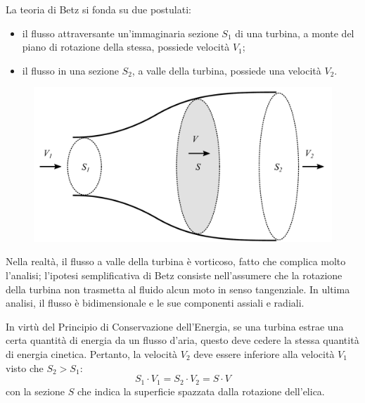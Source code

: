 La teoria di Betz si fonda su due postulati:
\begin{itemize}
\item il flusso attraversante un'immaginaria sezione $S_1$ di una turbina, a monte del piano di rotazione della stessa, possiede velocità $V_1$;
\item il flusso in una sezione $S_2$, a valle della turbina, possiede una velocità $V_2$.
\end{itemize}
\begin{figure}
\centering
  \includegraphics[width=.6\textwidth]{fig/Betz.pdf}
\caption{}
\label{}
\end{figure}
Nella realtà, il flusso a valle della turbina è vorticoso, fatto che complica molto l'analisi; l'ipotesi semplificativa di Betz consiste nell'assumere che la rotazione della turbina non trasmetta al fluido alcun moto in senso tangenziale. In ultima analisi, il flusso è bidimensionale e le sue componenti assiali e radiali. 

In virtù del Principio di Conservazione dell'Energia, se una turbina estrae una certa quantità di energia da un flusso d'aria, questo deve cedere la stessa quantità di energia cinetica. Pertanto, la velocità $V_2$ deve essere inferiore alla velocità $V_1$ visto che $S_2>S_1$:
\begin{equation}
S_1 \cdot V_1 = S_2 \cdot V_2 = S \cdot V
\end{equation}
con la sezione $S$ che indica la superficie spazzata dalla rotazione dell'elica.

